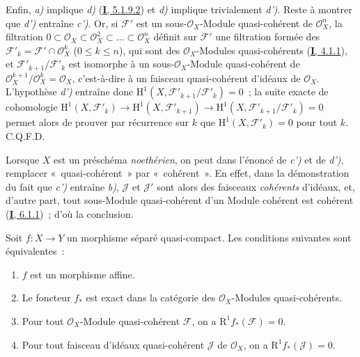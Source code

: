 Enfin, \emph{a)} implique \emph{d)} (\hyperref[I.5.1.9.2-fr]{\textbf{I}, 5.1.9.2}) et \emph{d)} implique
trivialement \emph{d')}. Reste à montrer que \emph{d')} entraîne \emph{c')}. Or, si
$\mathcal{F}'$ est un sous-$\mathcal{O}_X$-Module quasi-cohérent de
$\mathcal{O}_X^n$, la filtration
$0\subset\mathcal{O}_X\subset\mathcal{O}_X^2\subset\ldots\subset
\mathcal{O}_X^n$ définit sur $\mathcal{F}'$ une filtration formée des
$\mathcal{F}'_k=\mathcal{F}'\cap\mathcal{O}_X^k$ ($0\leq k\leq n$), qui
sont des $\mathcal{O}_X$-Modules quasi-cohérents
(\hyperref[I.4.1.1-fr]{\textbf{I}, 4.1.1}), et
$\mathcal{F}'_{k+1}/\mathcal{F}'_k$ est isomorphe à un
sous-$\mathcal{O}_X$-Module quasi-cohérent de
$\mathcal{O}_X^{k+1}/\mathcal{O}_X^k=\mathcal{O}_X$, c'est-à-dire à un
faisceau quasi-cohérent d'idéaux de $\mathcal{O}_X$. L'hypothèse \emph{d')}
entraîne donc
$\mathrm{H}^1(X,\mathcal{F}'_{k+1}/\mathcal{F}'_k)=0$~; la suite exacte de
cohomologie
$\mathrm{H}^1(X,\mathcal{F}'_k)\to\mathrm{H}^1(X,\mathcal{F}'_{k+1})
\to\mathrm{H}^1(X,\mathcal{F}'_{k+1}/\mathcal{F}'_k)=0$ permet alors de
prouver par récurrence sur $k$ que
$\mathrm{H}^1(X,\mathcal{F}'_k)=0$ pour tout $k$. C.Q.F.D.

\begin{remark}[5.2.1.1]
\label{II.5.2.1.1-fr}
Lorsque $X$ est un préschéma \emph{noethérien}, on peut dans l'énoncé de \emph{c')} et de
\emph{d')}, remplacer «~quasi-cohérent~» par «~cohérent~». En effet, dans la
démonstration du fait que \emph{c')} entraîne \emph{b)}, $\mathcal{J}$ et $\mathcal{J}'$
sont alors des faisceaux \emph{cohérents} d'idéaux, et, d'autre part, tout
sous-Module quasi-cohérent d'un Module cohérent est cohérent
(\hyperref[I.6.1.1-fr]{\textbf{I}, 6.1.1})~; d'où la conclusion.
\end{remark}

\begin{corollary}[5.2.2]
\label{II.5.2.2-fr}
Soit $f:X\to Y$ un morphisme séparé quasi-compact. Les conditions suivantes
sont équivalentes~:
\begin{enumerate}
  \item[\rm{a)}] $f$ est un morphisme affine.
  \item[\rm{b)}] Le foncteur $f_*$ est exact dans la catégorie des
  $\mathcal{O}_X$-Modules quasi-cohérents.
  \item[\rm{c)}] Pour tout $\mathcal{O}_X$-Module quasi-cohérent
  $\mathcal{F}$, on a $\mathrm{R}^1f_*(\mathcal{F})=0$.
  \item[\rm{c')}] Pour tout faisceau d'idéaux quasi-cohérent $\mathcal{J}$
  de $\mathcal{O}_X$, on a $\mathrm{R}^1f_*(\mathcal{J})=0$.
\end{enumerate}
\end{corollary}

